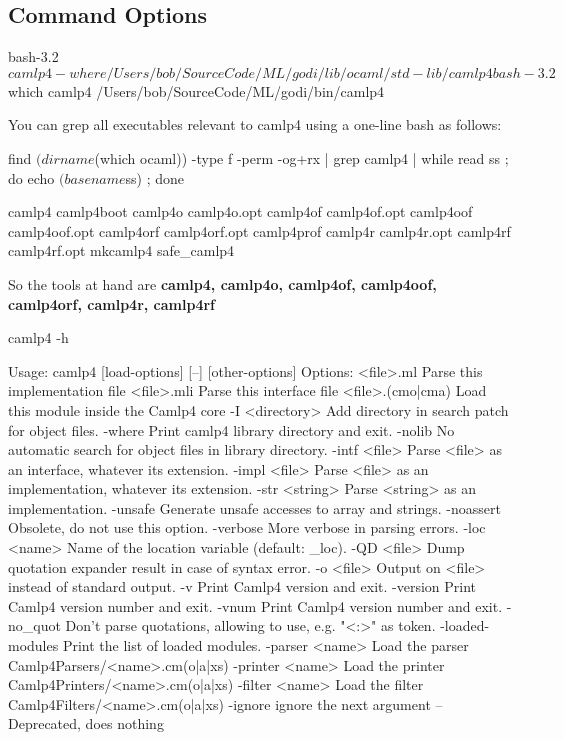 \subsection{Command Options}


\begin{alternate}
bash-3.2$ camlp4 -where
/Users/bob/SourceCode/ML/godi/lib/ocaml/std-lib/camlp4
bash-3.2$ which camlp4
/Users/bob/SourceCode/ML/godi/bin/camlp4
\end{alternate}


You can grep all executables relevant to camlp4 using a one-line bash
as follows:
\begin{bluetext}
find $(dirname $(which ocaml)) -type f -perm -og+rx | grep camlp4 |
while read ss ; do echo $(basename $ss) ; done
\end{bluetext}

\begin{bluetext}  
camlp4
camlp4boot
camlp4o
camlp4o.opt
camlp4of
camlp4of.opt
camlp4oof
camlp4oof.opt
camlp4orf
camlp4orf.opt
camlp4prof
camlp4r
camlp4r.opt
camlp4rf
camlp4rf.opt
mkcamlp4
safe_camlp4
\end{bluetext}

So the tools at hand are \textbf{camlp4, camlp4o, camlp4of, camlp4oof,
  camlp4orf, camlp4r, camlp4rf }

\begin{bluetext}
camlp4 -h

Usage: camlp4 [load-options] [--] [other-options]
Options:
<file>.ml        Parse this implementation file
<file>.mli       Parse this interface file
<file>.(cmo|cma) Load this module inside the Camlp4 core
  -I <directory>   Add directory in search patch for object files.
  -where           Print camlp4 library directory and exit.
  -nolib           No automatic search for object files in library directory.
  -intf <file>     Parse <file> as an interface, whatever its extension.
  -impl <file>     Parse <file> as an implementation, whatever its extension.
  -str <string>    Parse <string> as an implementation.
  -unsafe          Generate unsafe accesses to array and strings.
  -noassert        Obsolete, do not use this option.
  -verbose         More verbose in parsing errors.
  -loc <name>      Name of the location variable (default: _loc).
  -QD <file>       Dump quotation expander result in case of syntax error.
  -o <file>        Output on <file> instead of standard output.
  -v               Print Camlp4 version and exit.
  -version         Print Camlp4 version number and exit.
  -vnum            Print Camlp4 version number and exit.
  -no_quot         Don't parse quotations, allowing to use, e.g. "<:>" as token.
  -loaded-modules  Print the list of loaded modules.
  -parser <name>   Load the parser Camlp4Parsers/<name>.cm(o|a|xs)
  -printer <name>  Load the printer Camlp4Printers/<name>.cm(o|a|xs)
  -filter <name>   Load the filter Camlp4Filters/<name>.cm(o|a|xs)
  -ignore          ignore the next argument
  --               Deprecated, does nothing    
\end{bluetext}

